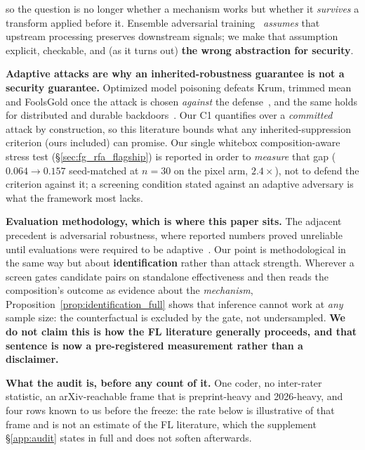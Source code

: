 \documentclass{article}
\begin{document}
so the question is no longer whether a mechanism works but whether it \emph{survives} a transform applied before it. Ensemble adversarial training~\citep{tramer2018ensemble} \emph{assumes} that upstream processing preserves downstream signals; we make that assumption explicit, checkable, and (as it turns out) \textbf{the wrong abstraction for security}.

\textbf{Adaptive attacks are why an inherited-robustness guarantee is not a security guarantee.} Optimized model poisoning defeats Krum, trimmed mean and FoolsGold once the attack is chosen \emph{against} the defense~\citep{shejwalkar2021manipulating,bhagoji2019analyzing}, and the same holds for distributed and durable backdoors~\citep{xie2019dba,wang2020attack,zhang2022neurotoxin}. Our C1 quantifies over a \emph{committed} attack by construction, so this literature bounds what any inherited-suppression criterion (ours included) can promise. Our single whitebox composition-aware stress test (§\ref{sec:fg_rfa_flagship}) is reported in order to \emph{measure} that gap ($0.064 \to 0.157$ seed-matched at $n{=}30$ on the pixel arm, $2.4\times$), not to defend the criterion against it; a screening condition stated against an adaptive adversary is what the framework most lacks.

\textbf{Evaluation methodology, which is where this paper sits.} The adjacent precedent is adversarial robustness, where reported numbers proved unreliable until evaluations were required to be adaptive~\citep{croce2020robustbench}. Our point is methodological in the same way but about \textbf{identification} rather than attack strength. Wherever a screen gates candidate pairs on standalone effectiveness and then reads the composition's outcome as evidence about the \emph{mechanism}, Proposition~\ref{prop:identification_full} shows that inference cannot work at \emph{any} sample size: the counterfactual is excluded by the gate, not undersampled. \textbf{We do not claim this is how the FL literature generally proceeds, and that sentence is now a pre-registered measurement rather than a disclaimer.}

\noindent \textbf{What the audit is, before any count of it.} One coder, no inter-rater statistic, an arXiv-reachable frame that is preprint-heavy and 2026-heavy, and four rows known to us before the freeze: the rate below is illustrative of that frame and is not an estimate of the FL literature, which the supplement §\ref{app:audit} states in full and does not soften afterwards.
\end{document}
